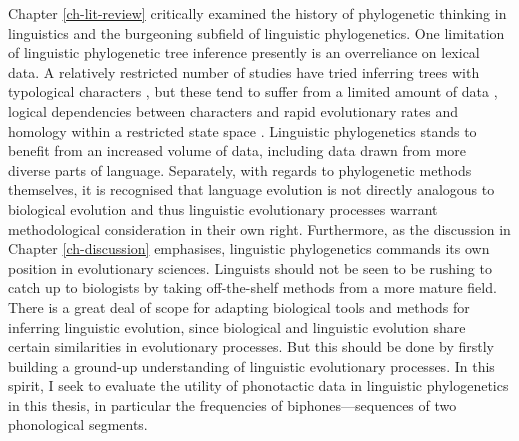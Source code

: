 Chapter \ref{ch-lit-review} critically examined the history of phylogenetic thinking in linguistics and the burgeoning subfield of linguistic phylogenetics. One limitation of linguistic phylogenetic tree inference presently is an overreliance on lexical data. A relatively restricted number of studies have tried inferring trees with typological characters \autocite[e.g.][]{sicoli_linguistic_2014}, but these tend to suffer from a limited amount of data \autocite{yanovich_phylogenetic_2020}, logical dependencies between characters \autocite{yanovich_phylogenetic_2020} and rapid evolutionary rates and homology within a restricted state space \autocite{greenhill_evolutionary_2017}. Linguistic phylogenetics stands to benefit from an increased volume of data, including data drawn from more diverse parts of language. Separately, with regards to phylogenetic methods themselves, it is recognised that language evolution is not directly analogous to biological evolution and thus linguistic evolutionary processes warrant methodological consideration in their own right. Furthermore, as the discussion in Chapter \ref{ch-discussion} emphasises, linguistic phylogenetics commands its own position in evolutionary sciences. Linguists should not be seen to be rushing to catch up to biologists by taking off-the-shelf methods from a more mature field. There is a great deal of scope for adapting biological tools and methods for inferring linguistic evolution, since biological and linguistic evolution share certain similarities in evolutionary processes. But this should be done by firstly building a ground-up understanding of linguistic evolutionary processes. In this spirit, I seek to evaluate the utility of phonotactic data in linguistic phylogenetics in this thesis, in particular the frequencies of biphones---sequences of two phonological segments.

